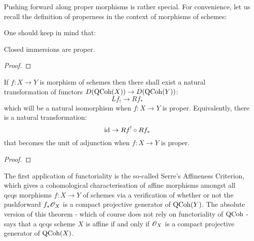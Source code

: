         \begin{definition} \label{def: dual_stable_(infinity, 1)_categories}
            
        \end{definition}
        
        Pushing forward along proper morphisms is rather special. For convenience, let us recall the definition of properness in the context of morphisms of schemes:
        \begin{definition} \label{def: proper_morphisms}
            
        \end{definition}
        One should keep in mind that:
        \begin{example}
            Closed immersions are proper.
        \end{example}
        \begin{lemma} \label{lemma: dualising_complexes_and_properly_supported_cohomology}
            
        \end{lemma}
            \begin{proof}
                
            \end{proof}
        \begin{theorem} \label{theorem: proper_pushforwards}
            If $f: X \to Y$ is morphism of schemes then there shall exist a natural transformation of functors $D(\mathrm{QCoh}(X)) \to D(\mathrm{QCoh}(Y))$:
                $$Lf_! \to Rf_*$$
            which will be a natural isomorphism when $f: X \to Y$ is proper. Equivalently, there is a natural transformation:
                $$\mathrm{id} \to Rf^! \circ Rf_*$$
            that becomes the unit of adjunction when $f: X \to Y$ is proper. 
        \end{theorem}
            \begin{proof}
                
            \end{proof}

        The first application of functoriality is the so-called Serre's Affineness Criterion, which gives a cohomological characterisation of affine morphisms amongst all qcqs morphisms $f: X \to Y$ of schemes via a verification of whether or not the pushforward $f_*\mathscr{O}_X$ is a compact projective generator of $\mathrm{QCoh}(Y)$. The absolute version of this theorem - which of course does not rely on functoriality of $\mathrm{QCoh}$ - says that a qcqs scheme $X$ is affine if and only if $\mathscr{O}_X$ is a compact projective generator of $\mathrm{QCoh}(X)$.
        

